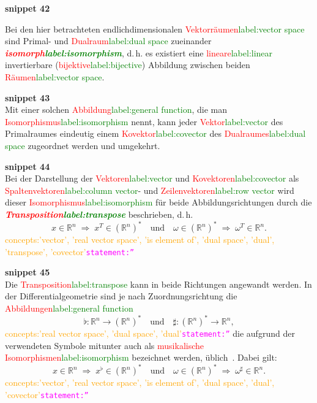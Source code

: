 \documentclass[a4paper,twoside,english,ngerman,deutsch,german,sectrefs,envcountsame,envcountchap]{svmono}
\newcommand{\setref}[2]{\textcolor{red}{#1}\textcolor{green}{#2}}
\newcommand{\snippet}[1]{\textbf{snippet #1}\\}
\newcommand{\eqnote}[2]{\textcolor{orange}{#1}\textcolor{magenta}{\texttt{#2}}}
\begin{document}
\snippet{42}
\begin{remark}
\label{rem:Isomorphismus-Primal-Dual}Bei den hier betrachteten endlichdimensionalen
\setref{Vektorräumen}{label:vector space} sind Primal- und \setref{Dualraum}{label:dual space} zueinander \textbf{\em \setref{isomorph}{label:isomorphism}},
d.\,h. es existiert eine \setref{lineare}{label:linear} invertierbare (\setref{bijektive}{label:bijective}) Abbildung zwischen beiden \setref{Räumen}{label:vector space}.




\snippet{43}
Mit einer solchen \setref{Abbildung}{label:general function}, die man \setref{Isomorphismus}{label:isomorphism} nennt, kann jeder \setref{Vektor}{label:vector} des Primalraumes eindeutig einem \setref{Kovektor}{label:covector} des \setref{Dualraumes}{label:dual space} zugeordnet werden und umgekehrt.

\snippet{44}
Bei der Darstellung der \setref{Vektoren}{label:vector} und \setref{Kovektoren}{label:covector} als \setref{Spaltenvektoren}{label:column vector}- und \setref{Zeilenvektoren}{label:row vector} wird dieser
\setref{Isomorphismus}{label:isomorphism} für beide Abbildungsrichtungen durch die \textbf{\em \setref{Transposition}{label:transpose}}
beschrieben, d.\,h.
\[
x\in{\mathbb{R}}^{n}\;\Rightarrow\;x^{T}\in({\mathbb{R}}^{n})^{*}\quad\text{und}\quad\omega\in({\mathbb{R}}^{n})^{*}\;\Rightarrow\;\omega^{T}\in{\mathbb{R}}^{n}.
\]\eqnote{concepts:'vector', 'real vector space', 'is element of', 'dual space', 'dual', 'transpose', 'covector'}{statement:''}

\snippet{45}
Die \setref{Transposition}{label:transpose} kann in beide Richtungen angewandt werden. In der Differentialgeometrie sind je nach Zuordnungsrichtung die \setref{Abbildungen}{label:general function}
\[
\flat:{\mathbb{R}}^{n}\to({\mathbb{R}}^{n})^{*}\quad\text{und}\quad\sharp:({\mathbb{R}}^{n})^{*}\to{\mathbb{R}}^{n},
\]\eqnote{concepts:'real vector space', 'dual space', 'dual'}{statement:''}
die aufgrund der verwendeten Symbole mitunter auch als \setref{musikalische Isomorphismen}{label:isomorphism} bezeichnet werden, üblich~\cite{marsden2001,bullo2004,jaenich2005}. Dabei gilt:
\[
x\in{\mathbb{R}}^{n}\;\Rightarrow\;x^{\flat}\in({\mathbb{R}}^{n})^{*}\quad\text{und}\quad\omega\in({\mathbb{R}}^{n})^{*}\;\Rightarrow\;\omega^{\sharp}\in{\mathbb{R}}^{n}.
\]\eqnote{concepts:'vector', 'real vector space', 'is element of', 'dual space', 'dual', 'covector'}{statement:''}
\end{remark}
\end{document}
